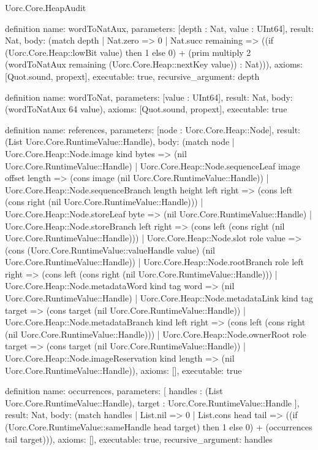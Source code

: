 \begin{lexlean}{Uorc.Core.HeapAudit}
\begin{semanticmodule}
definition{
  name: wordToNatAux,
  parameters: [depth : Nat, value : UInt64],
  result: Nat,
  body: (match depth
    | Nat.zero => 0
    | Nat.succ remaining => ((if (Uorc.Core.Heap::lowBit value) then 1 else 0) + (prim multiply 2 (wordToNatAux remaining (Uorc.Core.Heap::nextKey value)) : Nat))),
  axioms: [Quot.sound, propext],
  executable: true,
  recursive_argument: depth
}

definition{
  name: wordToNat,
  parameters: [value : UInt64],
  result: Nat,
  body: (wordToNatAux 64 value),
  axioms: [Quot.sound, propext],
  executable: true
}

definition{
  name: references,
  parameters: [node : Uorc.Core.Heap::Node],
  result: (List Uorc.Core.RuntimeValue::Handle),
  body: (match node
    | Uorc.Core.Heap::Node.image kind bytes => (nil Uorc.Core.RuntimeValue::Handle)
    | Uorc.Core.Heap::Node.sequenceLeaf image offset length => (cons image (nil Uorc.Core.RuntimeValue::Handle))
    | Uorc.Core.Heap::Node.sequenceBranch length height left right => (cons left (cons right (nil Uorc.Core.RuntimeValue::Handle)))
    | Uorc.Core.Heap::Node.storeLeaf byte => (nil Uorc.Core.RuntimeValue::Handle)
    | Uorc.Core.Heap::Node.storeBranch left right => (cons left (cons right (nil Uorc.Core.RuntimeValue::Handle)))
    | Uorc.Core.Heap::Node.slot role value => (cons (Uorc.Core.RuntimeValue::valueHandle value) (nil Uorc.Core.RuntimeValue::Handle))
    | Uorc.Core.Heap::Node.rootBranch role left right => (cons left (cons right (nil Uorc.Core.RuntimeValue::Handle)))
    | Uorc.Core.Heap::Node.metadataWord kind tag word => (nil Uorc.Core.RuntimeValue::Handle)
    | Uorc.Core.Heap::Node.metadataLink kind tag target => (cons target (nil Uorc.Core.RuntimeValue::Handle))
    | Uorc.Core.Heap::Node.metadataBranch kind left right => (cons left (cons right (nil Uorc.Core.RuntimeValue::Handle)))
    | Uorc.Core.Heap::Node.ownerRoot role target => (cons target (nil Uorc.Core.RuntimeValue::Handle))
    | Uorc.Core.Heap::Node.imageReservation kind length => (nil Uorc.Core.RuntimeValue::Handle)),
  axioms: [],
  executable: true
}

definition{
  name: occurrences,
  parameters: [
    handles : (List Uorc.Core.RuntimeValue::Handle),
    target : Uorc.Core.RuntimeValue::Handle
  ],
  result: Nat,
  body: (match handles
    | List.nil => 0
    | List.cons head tail => ((if (Uorc.Core.RuntimeValue::sameHandle head target) then 1 else 0) + (occurrences tail target))),
  axioms: [],
  executable: true,
  recursive_argument: handles
}


\end{semanticmodule}
\end{lexlean}
